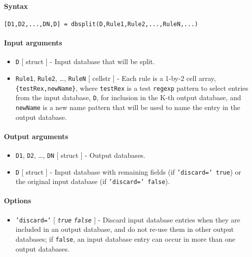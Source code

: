 


	\paragraph{Syntax}\label{syntax}

\begin{verbatim}
[D1,D2,...,DN,D] = dbsplit(D,Rule1,Rule2,...,RuleN,...)
\end{verbatim}

\paragraph{Input arguments}\label{input-arguments}

\begin{itemize}
\item
  \texttt{D} {[} struct {]} - Input database that will be split.
\item
  \texttt{Rule1}, \texttt{Rule2}, \ldots{}, \texttt{RuleN} {[} cellstr
  {]} - Each rule is a 1-by-2 cell array, \texttt{\{testRex,newName\}},
  where \texttt{testRex} is a test \texttt{regexp} pattern to select
  entries from the input database, \texttt{D}, for inclusion in the K-th
  output database, and \texttt{newName} is a new name pattern that will
  be used to name the entry in the output database.
\end{itemize}

\paragraph{Output arguments}\label{output-arguments}

\begin{itemize}
\item
  \texttt{D1}, \texttt{D2}, \ldots{}, \texttt{DN} {[} struct {]} -
  Output databases.
\item
  \texttt{D} {[} struct {]} - Input database with remaining fields (if
  \texttt{'discard=' true}) or the original input database (if
  \texttt{'discard=' false}).
\end{itemize}

\paragraph{Options}\label{options}

\begin{itemize}
\itemsep1pt\parskip0pt
\item
  \texttt{'discard='} {[} \emph{\texttt{true}} \textbar{}
  \emph{\texttt{false}} {]} - Discard input database entries when they
  are included in an output database, and do not re-use them in other
  output databases; if \texttt{false}, an input database entry can occur
  in more than one output databases.
\end{itemize}

